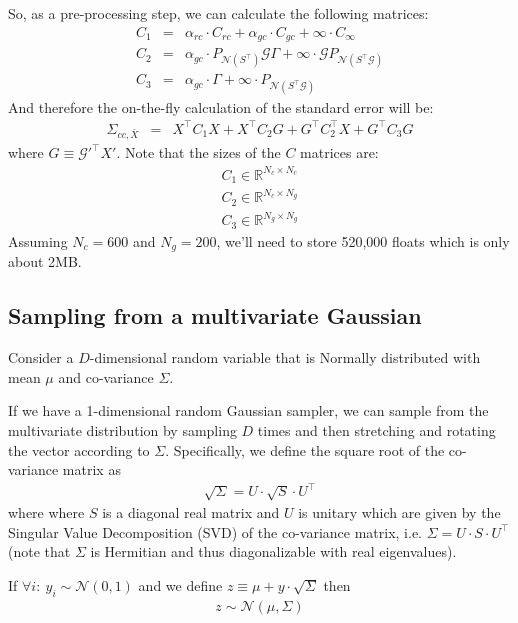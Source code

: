 \documentclass{article}
\newcommand{\Gmat}{\mathcal{G}}
\newcommand{\PNmat}[1]{P_{\mathcal{N}\left(#1\right)}}
\begin{document}
So, as a pre-processing step, we can calculate the following matrices:
\begin{eqnarray}
	C_1 &=& \alpha_{rc} \cdot C_{rc} + \alpha_{gc} \cdot C_{gc} + \infty \cdot C_\infty \\
	C_2 &=& \alpha_{gc} \cdot \PNmat{S^\top} \Gmat \Gamma + \infty \cdot \Gmat \PNmat{S^\top\Gmat} \\
	C_3 &=& \alpha_{gc} \cdot \Gamma + \infty \cdot \PNmat{S^\top\Gmat} 
\end{eqnarray}
And therefore the on-the-fly calculation of the standard error will be:
\begin{eqnarray}
	\Sigma_{cc,\bar{X}} &=& X^\top C_1 X + X^\top C_2 G + G^\top C_2^\top X + G^\top C_3 G
\end{eqnarray}
where $G \equiv \Gmat'^\top X'$. Note that the sizes of the $C$ matrices are:
\begin{eqnarray}
	C_1 \in \mathbb{R}^{N_c \times N_c} \\
	C_2 \in \mathbb{R}^{N_c \times N_g} \\
	C_3 \in \mathbb{R}^{N_g \times N_g}
\end{eqnarray}
Assuming $N_c = 600$ and $N_g = 200$, we'll need to store 520,000 floats which is only about 2MB.

\subsection{Sampling from a multivariate Gaussian}
Consider a $D$-dimensional random variable that is Normally distributed with mean $\mu$ and co-variance $\Sigma$.

If we have a 1-dimensional random Gaussian sampler, we can sample from the multivariate distribution by sampling $D$ times and then stretching and rotating the vector according to $\Sigma$. Specifically, we define the square root of the co-variance matrix as
\begin{eqnarray}
	\sqrt{\Sigma} = U \cdot \sqrt{S} \cdot U^\top
\end{eqnarray}
where where $S$ is a diagonal real matrix and $U$ is unitary which are given by the Singular Value Decomposition (SVD) of the co-variance matrix, i.e. $\Sigma = U \cdot S \cdot U^\top$ (note that $\Sigma$ is Hermitian and thus diagonalizable with real eigenvalues).

If $\forall i :~ y_i \sim \mathcal{N}(0, 1)$ and we define $z \equiv \mu + y \cdot \sqrt{\Sigma}$ then
\begin{eqnarray}
z \sim \mathcal{N}(\mu, \Sigma)
\end{eqnarray}
\end{document}
